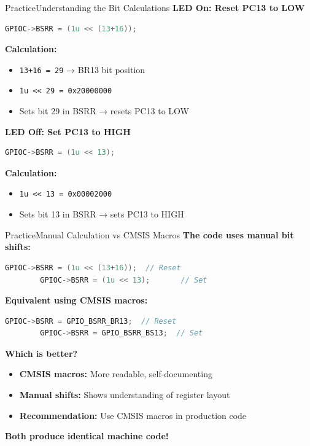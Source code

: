\documentclass{beamer}
\begin{document}
\begin{frame}[fragile]{Practice}{Understanding the Bit Calculations}
	\textbf{LED On: Reset PC13 to LOW}
	\begin{lstlisting}[language=C, basicstyle=\ttfamily\small]
		GPIOC->BSRR = (1u << (13+16));
	\end{lstlisting}
	
	\textbf{Calculation:}
	\begin{itemize}
		\item \texttt{13+16 = 29} → BR13 bit position
		\item \texttt{1u << 29 = 0x20000000}
		\item Sets bit 29 in BSRR → resets PC13 to LOW
	\end{itemize}
	
	\medskip
	\textbf{LED Off: Set PC13 to HIGH}
	\begin{lstlisting}[language=C, basicstyle=\ttfamily\small]
		GPIOC->BSRR = (1u << 13);
	\end{lstlisting}
	
	\textbf{Calculation:}
	\begin{itemize}
		\item \texttt{1u << 13 = 0x00002000}
		\item Sets bit 13 in BSRR → sets PC13 to HIGH
	\end{itemize}
\end{frame}
\begin{frame}[fragile]{Practice}{Manual Calculation vs CMSIS Macros}
	\textbf{The code uses manual bit shifts:}
	\begin{lstlisting}[language=C, basicstyle=\ttfamily\footnotesize]
		GPIOC->BSRR = (1u << (13+16));  // Reset
		GPIOC->BSRR = (1u << 13);       // Set
	\end{lstlisting}
	
	\textbf{Equivalent using CMSIS macros:}
	\begin{lstlisting}[language=C, basicstyle=\ttfamily\footnotesize]
		GPIOC->BSRR = GPIO_BSRR_BR13;  // Reset
		GPIOC->BSRR = GPIO_BSRR_BS13;  // Set
	\end{lstlisting}
	
	\textbf{Which is better?}
	\begin{itemize}
		\item \textbf{CMSIS macros:} More readable, self-documenting
		\item \textbf{Manual shifts:} Shows understanding of register layout
		\item \textbf{Recommendation:} Use CMSIS macros in production code
	\end{itemize}
	
	\textbf{Both produce identical machine code!}
\end{frame}
\end{document}
